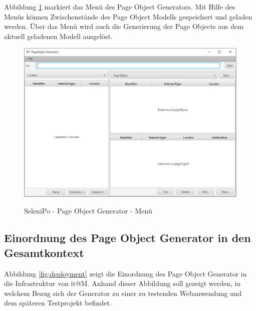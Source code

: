 \newpage

Abbildung \ref{fig:poGeneratorMenu} markiert das Menü des Page Object Generators. Mit Hilfe des Menüs können Zwischenstände des Page Object Modells gespeichert und geladen werden.
Über das Menü wird auch die Generierung der Page Objects aus dem aktuell geladenen Modell ausgelöst.

\begin{figure}[htb]
  \centering  
  \includegraphics[scale=0.5]{img/poGeneratorMenu.JPG}\\
  \caption{SeleniPo - Page Object Generator - Menü}
  \label{fig:poGeneratorMenu}
\end{figure}

\subsection{Einordnung des Page Object Generator in den Gesamtkontext}
\label{sec:deploymentsicht}


Abbildung \ref{fig:deployment} zeigt die Einordnung des Page Object Generator in die Infrastruktur von it@M. Anhand dieser Abbildung soll gezeigt werden, in welchem Bezug sich der Generator zu einer zu testenden Webanwendung und dem späteren Testprojekt befindet.

